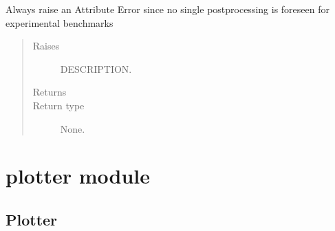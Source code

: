 \documentclass[letterpaper,10pt,english]{sphinxmanual}
\begin{document}
\begin{fulllineitems}
\begin{fulllineitems}
\begin{quote}
\begin{description}
\end{description}\end{quote}

\end{fulllineitems}


\begin{fulllineitems}
\label{\detokenize{api/postprocessing:expoutput.ExperimentalOutput.single_postprocess}}
\sphinxAtStartPar
Always raise an Attribute Error since no single post\sphinxhyphen{}processing is
foreseen for experimental benchmarks
\begin{quote}\begin{description}
\item[{Raises}] \leavevmode
\sphinxAtStartPar
{} \textendash{} DESCRIPTION.

\item[{Returns}] \leavevmode
\sphinxAtStartPar


\item[{Return type}] \leavevmode
\sphinxAtStartPar
None.

\end{description}\end{quote}

\end{fulllineitems}


\end{fulllineitems}



\section{plotter module}
\label{\detokenize{api/postprocessing:plotter-module}}

\subsection{Plotter}
\label{\detokenize{api/postprocessing:plotter}}
\end{document}
